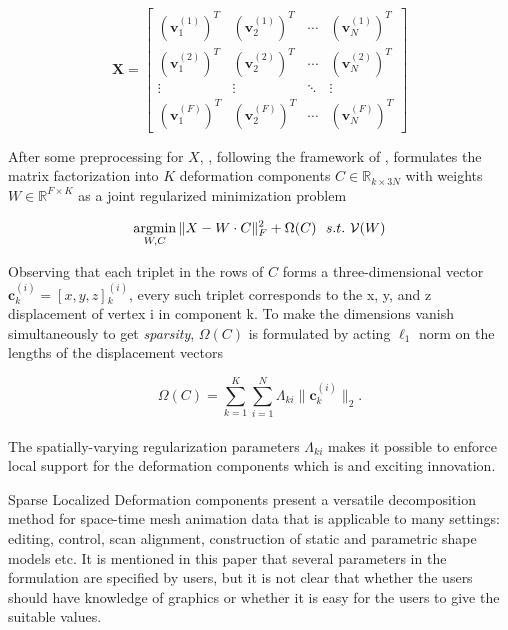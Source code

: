 \small{
\begin{equation}
 \label{eq:edgecotanoperator}
 \mathbf{X} = {\left[ \begin{array}{cccc}
 (\mathbf{v}{_1^{(1)}})^{T} & (\mathbf{v}{_2^{(1)}})^{T} & \cdots & (\mathbf{v}{_{N}^{(1)}})^{T}\\
 (\mathbf{v}{_1^{(2)}})^{T} & (\mathbf{v}{_2^{(2)}})^{T} & \cdots & (\mathbf{v}{_{N}^{(2)}})^{T}\\
 \vdots & \vdots & \ddots & \vdots\\
 (\mathbf{v}{_1^{(F)}})^{T} & (\mathbf{v}{_2^{(F)}})^{T} & \cdots & (\mathbf{v}{_{N}^{(F)}})^{T}
 \end{array}
 \right]}
\end{equation}
}

After some preprocessing for $X$, \cite{neumann2013sparse},
following the framework of \cite{zou2006sparse},
formulates the matrix factorization into $K$ deformation components $C\in \mathbb{R}_{k\times 3N}$ with weights
$W\in \mathbb{R}^{F\times K}$ as a joint regularized minimization problem

\small{
\begin{equation}
 \label{eq:sparselocal}
 \mathop{\operatorname*{argmin}}_{W,C}\|X-W\cdot C\|{_{F}^2}+\Omega(C)~~s.t.~\mathcal{V}(W)
\end{equation}
}

Observing that each triplet in the rows of $C$ forms a three-dimensional vector $\mathbf{c}{_{k}^{(i)}}=[x,y,z]{_{k}^{(i)}}$,
every such triplet corresponds to the x, y, and z displacement of vertex i in component k.
To make the dimensions vanish simultaneously to get \textit{sparsity}, $\Omega(C)$ is formulated by acting $\ell_1$ norm on the lengths of the displacement vectors

\small{
\begin{equation}
 \label{eq:sparselocal}
 \Omega(C)=\sum_{k=1}^{K}\sum_{i=1}^{N}\Lambda_{ki}\|\mathbf{c}{_{k}^{(i)}}\|_2.
\end{equation}
}
\\
The spatially-varying regularization parameters $\Lambda_{ki}$ makes it possible to enforce local support for the deformation components which is and exciting innovation.

Sparse Localized Deformation components present a versatile decomposition method for space-time mesh animation data that is applicable to many settings: editing, control, scan alignment, construction of static and parametric shape models etc.
It is mentioned in this paper that several parameters in the formulation are specified by users,
but it is not clear that whether the users should have knowledge of graphics or
whether it is easy for the users to give the suitable values.

